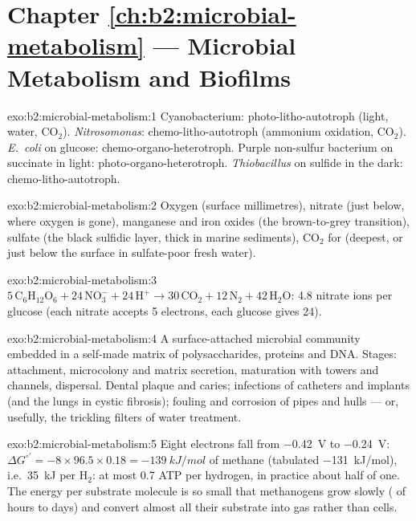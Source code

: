 \section*{Chapter \ref{ch:b2:microbial-metabolism} --- Microbial Metabolism and Biofilms}

\begin{solution}{exo:b2:microbial-metabolism:1}
Cyanobacterium: photo-litho-autotroph (light, water, $\mathrm{CO_2}$).
\emph{Nitrosomonas}: chemo-litho-autotroph (ammonium oxidation,
$\mathrm{CO_2}$). \emph{E.~coli} on glucose: chemo-organo-heterotroph.
Purple non-sulfur bacterium on succinate in light:
photo-organo-heterotroph. \emph{Thiobacillus} on sulfide in the dark:
chemo-litho-autotroph.
\end{solution}

\begin{solution}{exo:b2:microbial-metabolism:2}
Oxygen (surface millimetres), nitrate (just below, where oxygen is
gone), manganese and iron oxides (the brown-to-grey transition),
sulfate (the black sulfidic layer, thick in marine sediments),
$\mathrm{CO_2}$ for  (deepest, or just below the
surface in sulfate-poor fresh water).
\end{solution}

\begin{solution}{exo:b2:microbial-metabolism:3}
$5\,\mathrm{C_6H_{12}O_6} + 24\,\mathrm{NO_3^-} + 24\,\mathrm{H^+}
\to 30\,\mathrm{CO_2} + 12\,\mathrm{N_2} + 42\,\mathrm{H_2O}$: 4.8
nitrate ions per glucose (each nitrate accepts 5 electrons, each
glucose gives 24).
\end{solution}

\begin{solution}{exo:b2:microbial-metabolism:4}
A surface-attached microbial community embedded in a self-made
matrix of polysaccharides, proteins and DNA. Stages: attachment,
microcolony and matrix secretion, maturation with towers and
channels, dispersal. Dental plaque and caries; infections of
catheters and implants (and the lungs in cystic fibrosis); fouling
and corrosion of pipes and hulls --- or, usefully, the trickling
filters of water treatment.
\end{solution}

\begin{solution}{exo:b2:microbial-metabolism:5}
Eight electrons fall from \qty{-0.42}{V} to \qty{-0.24}{V}:
$\Delta G^{\circ\prime} = -8\times 96.5\times 0.18 =
\qty{-139}{kJ/mol}$ of methane (tabulated \qty{-131}{kJ/mol}), i.e.\
\qty{35}{kJ} per $\mathrm{H_2}$: at most 0.7 ATP per hydrogen, in
practice about half of one. The energy per substrate molecule is so
small that methanogens grow slowly ( of hours to
days) and convert almost all their substrate into gas rather than
cells.
\end{solution}

